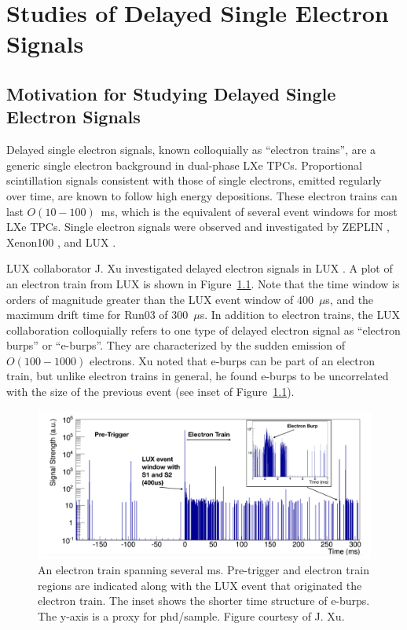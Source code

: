 \chapter{Studies of Delayed Single Electron Signals}
\label{ch:etrains} 

\section{Motivation for Studying Delayed Single Electron Signals}
Delayed single electron signals, known colloquially as ``electron trains'', are a generic single electron background in dual-phase \ac{LXe} \ac{TPC}s. Proportional scintillation signals consistent with those of single electrons, emitted regularly over time, are known to follow high energy depositions. These electron trains can last $O(10-100)$~ms, which is the equivalent of several event windows for most \ac{LXe} \ac{TPC}s. Single electron signals were observed and investigated by ZEPLIN \cite{Edwards2008} \cite{Santos2011}, Xenon100 \cite{Aprile2014}, and \ac{LUX} \cite{Xu2016}. 

\ac{LUX} collaborator J. Xu investigated delayed electron signals in \ac{LUX} \cite{Xu2016}. A plot of an electron train from \ac{LUX} is shown in Figure~\ref{fig:lux_etrain}. Note that the time window is orders of magnitude greater than the \ac{LUX} event window of 400~$\mu$s, and the maximum drift time for Run03 of 300~$\mu$s. In addition to electron trains, the \ac{LUX} collaboration colloquially refers to one type of delayed electron signal as ``electron burps'' or ``e-burps''. They are characterized by the sudden emission of $O(100-1000)$ electrons. Xu noted that e-burps can be part of an electron train, but unlike electron trains in general, he found e-burps to be uncorrelated with the size of the previous event (see inset of Figure~\ref{fig:lux_etrain}). 

\begin{figure}[htbp]
\begin{center}
\includegraphics[width=\textwidth]{figures/etrains/lux_etrain_eburp.png}
\caption{An electron train spanning several ms. Pre-trigger and electron train regions are indicated along with the \acs{LUX} event that originated the electron train. The inset shows the shorter time structure of e-burps. The y-axis is a proxy for phd/sample. Figure courtesy of J. Xu. }
\label{fig:lux_etrain}
\end{center}
\end{figure}



